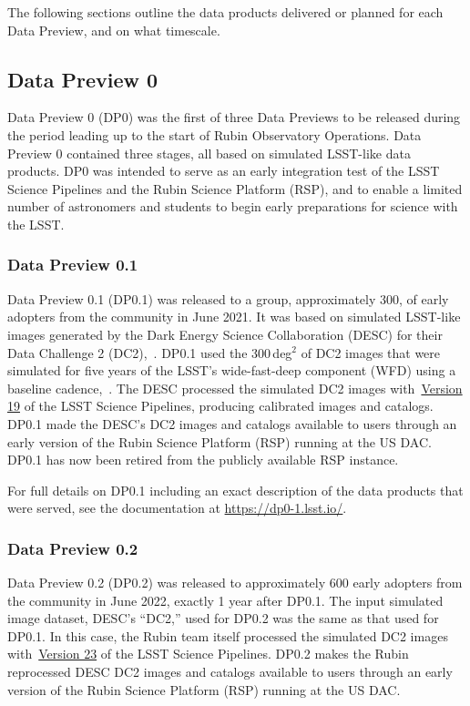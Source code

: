 The following sections outline the data products delivered or planned for each Data Preview, and on what timescale.

\subsection{Data Preview 0}
\label{sec:dp0}

Data Preview 0 (DP0) was the first of three Data Previews to be released during the period leading up to the start of Rubin Observatory Operations.
Data Preview 0 contained three stages, all based on simulated LSST-like data products.
DP0 was intended to serve as an early integration test of the LSST Science Pipelines and the Rubin Science Platform (RSP), and to enable a limited number of astronomers and students to begin early preparations for science with the LSST.

\subsubsection{Data Preview 0.1}
\label{sec:dp01}

Data Preview 0.1 (DP0.1) was released to a group, approximately 300,  of early adopters from the community in June 2021.
It was based on simulated LSST-like images generated by the Dark Energy Science Collaboration (DESC) for their Data Challenge 2 (DC2),~\citep[][]{2021ApJS..253...31L}.
DP0.1 used the 300\,deg$^{2}$ of DC2 images that were simulated for five years of the LSST’s wide-fast-deep component (WFD) using a baseline cadence,~.
The DESC processed the simulated DC2 images with~\href{https://pipelines.lsst.io/v/v19_0_0/index.html}{Version 19} of the LSST Science Pipelines, producing calibrated images and catalogs.
DP0.1 made the DESC’s DC2 images and catalogs available to users through an early version of the Rubin Science Platform (RSP) running at the US DAC.
DP0.1 has now been retired from the publicly available RSP instance.

For full details on DP0.1 including an exact description of the data products that were served, see the documentation at \url{https://dp0-1.lsst.io/}.

\subsubsection{Data Preview 0.2}
\label{sec:dp02}

Data Preview 0.2 (DP0.2) was released to approximately 600 early adopters from the community in June 2022, exactly 1 year after DP0.1.
The input simulated image dataset, DESC's ``DC2,'' used for DP0.2 was the same as that used for DP0.1.
In this case, the Rubin team itself processed the simulated DC2 images with~\href{https://pipelines.lsst.io/v/v23_0_0/index.html}{Version 23} of the LSST Science Pipelines.
DP0.2 makes the Rubin reprocessed DESC DC2 images and catalogs available to users through an early version of the Rubin Science Platform (RSP) running at the US DAC.

